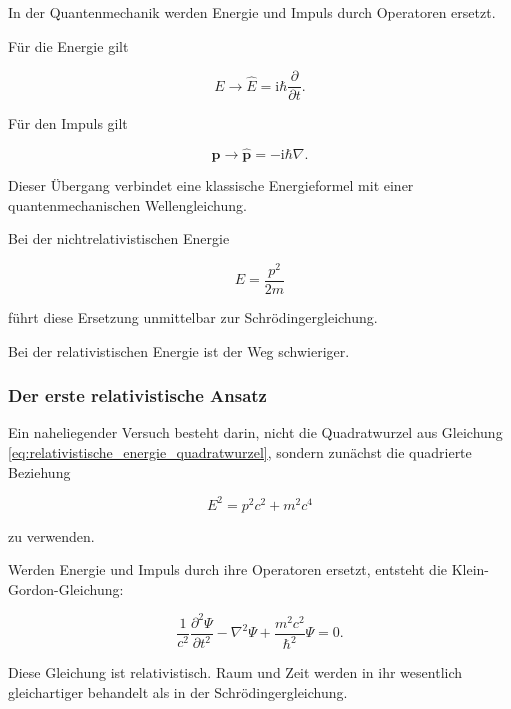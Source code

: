 In der Quantenmechanik werden Energie und Impuls durch Operatoren%
 ersetzt.

Für die Energie gilt

\begin{equation}
	E
	\longrightarrow
	\hat{E}
	=
	\mathrm{i}\hbar
	\frac{\partial}{\partial t}.
	\label{eq:energieoperator_weg_dirac}
\end{equation}

Für den Impuls gilt

\begin{equation}
	\mathbf{p}
	\longrightarrow
	\hat{\mathbf{p}}
	=
	-\mathrm{i}\hbar\nabla.
	\label{eq:impulsoperator_weg_dirac}
\end{equation}

Dieser Übergang verbindet eine klassische Energieformel mit einer
quantenmechanischen Wellengleichung.

Bei der nichtrelativistischen Energie

\begin{equation}
	E
	=
	\frac{p^2}{2m}
\end{equation}

führt diese Ersetzung unmittelbar zur Schrödingergleichung.

Bei der relativistischen Energie ist der Weg schwieriger.

\subsubsection*{Der erste relativistische Ansatz}

Ein naheliegender Versuch besteht darin, nicht die Quadratwurzel aus
Gleichung \eqref{eq:relativistische_energie_quadratwurzel}, sondern
zunächst die quadrierte Beziehung

\begin{equation}
	E^2
	=
	p^2c^2
	+
	m^2c^4
\end{equation}

zu verwenden.

Werden Energie und Impuls durch ihre Operatoren ersetzt, entsteht die
Klein-Gordon-Gleichung:

\begin{equation}
	\frac{1}{c^2}
	\frac{\partial^2\Psi}{\partial t^2}
	-
	\nabla^2\Psi
	+
	\frac{m^2c^2}{\hbar^2}
	\Psi
	=
	0.
	\label{eq:klein_gordon_weg_dirac_einfach}
\end{equation}

Diese Gleichung ist relativistisch. Raum und Zeit werden in ihr
wesentlich gleichartiger behandelt als in der Schrödingergleichung.

